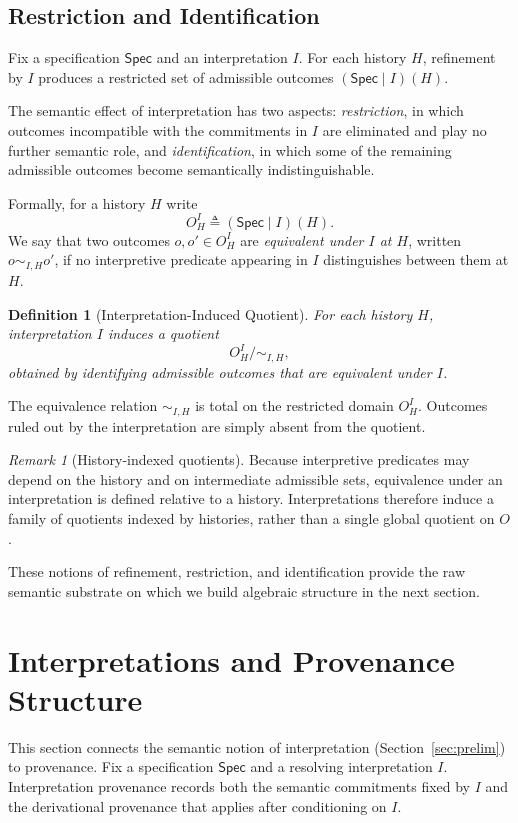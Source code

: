 \documentclass[acmsmall,nonacm]{acmart}
\newtheorem{definition}{Definition}
\theoremstyle{remark}
\newtheorem{remark}{Remark}
\numberwithin{definition}{section}
\numberwithin{theorem}{section}
\numberwithin{lemma}{section}
\numberwithin{corollary}{section}
\numberwithin{remark}{section}
\numberwithin{example}{section}
\numberwithin{observation}{section}
\numberwithin{assumption}{section}
\newcommand{\Spec}{\mathsf{Spec}}
\begin{document}
\subsection{Restriction and Identification}

Fix a specification $\Spec$ and an interpretation $I$.
For each history $H$, refinement by $I$ produces a restricted set of admissible
outcomes $(\Spec \mid I)(H)$.

The semantic effect of interpretation has two aspects:
\emph{restriction}, in which outcomes incompatible with the commitments in $I$ are eliminated and play no further semantic role, and \emph{identification}, in which some of the remaining admissible outcomes become semantically indistinguishable.

Formally, for a history $H$ write
\[
  O_H^I \triangleq (\Spec \mid I)(H).
\]
We say that two outcomes $o,o' \in O_H^I$ are \emph{equivalent under $I$ at $H$},
written $o \sim_{I,H} o'$, if no interpretive predicate appearing in $I$
distinguishes between them at $H$.

\begin{definition}[Interpretation-Induced Quotient]
For each history $H$, interpretation $I$ induces a quotient
\[
  O_H^I \big/ {\sim_{I,H}},
\]
obtained by identifying admissible outcomes that are equivalent under $I$.
\end{definition}

The equivalence relation $\sim_{I,H}$ is total on the restricted domain $O_H^I$.
Outcomes ruled out by the interpretation are simply absent from the quotient.

\begin{remark}[History-indexed quotients]
Because interpretive predicates may depend on the history and on intermediate
admissible sets, equivalence under an interpretation is defined relative to a
history.
Interpretations therefore induce a family of quotients indexed by histories,
rather than a single global quotient on $O$.
\end{remark}

These notions of refinement, restriction, and identification provide the raw
semantic substrate on which we build algebraic structure in the next section.


\section{Interpretations and Provenance Structure}
\label{sec:conditional-semiring}
This section connects the semantic notion of interpretation
(Section~\ref{sec:prelim}) to provenance.
Fix a specification $\Spec$ and a resolving interpretation $I$.
Interpretation provenance records both the semantic commitments fixed by $I$ and
the derivational provenance that applies after conditioning on $I$.
\end{document}
